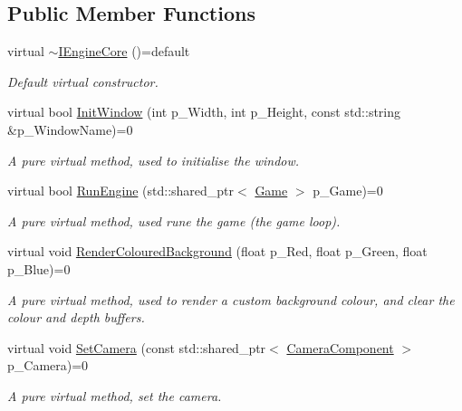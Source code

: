 \subsection*{Public Member Functions}
\begin{DoxyCompactItemize}
\item 
\mbox{\label{class_i_engine_core_a2befdb05ea4c96642116bd75ee372798}} 
virtual \mbox{\hyperlink{class_i_engine_core_a2befdb05ea4c96642116bd75ee372798}{$\sim$\+I\+Engine\+Core}} ()=default
\begin{DoxyCompactList}\small\item\em Default virtual constructor. \end{DoxyCompactList}\item 
virtual bool \mbox{\hyperlink{class_i_engine_core_afdda3dcf95128f802a9328b7f1d9a0bf}{Init\+Window}} (int p\+\_\+\+Width, int p\+\_\+\+Height, const std\+::string \&p\+\_\+\+Window\+Name)=0
\begin{DoxyCompactList}\small\item\em A pure virtual method, used to initialise the window. \end{DoxyCompactList}\item 
virtual bool \mbox{\hyperlink{class_i_engine_core_a34dab1237d44daac83d14676d2b17ff6}{Run\+Engine}} (std\+::shared\+\_\+ptr$<$ \mbox{\hyperlink{class_game}{Game}} $>$ p\+\_\+\+Game)=0
\begin{DoxyCompactList}\small\item\em A pure virtual method, used rune the game (the game loop). \end{DoxyCompactList}\item 
virtual void \mbox{\hyperlink{class_i_engine_core_adc681491ab4cdf75db64068221645635}{Render\+Coloured\+Background}} (float p\+\_\+\+Red, float p\+\_\+\+Green, float p\+\_\+\+Blue)=0
\begin{DoxyCompactList}\small\item\em A pure virtual method, used to render a custom background colour, and clear the colour and depth buffers. \end{DoxyCompactList}\item 
virtual void \mbox{\hyperlink{class_i_engine_core_ac9f6dbe2b0e1ece6f6cc44712b9b8751}{Set\+Camera}} (const std\+::shared\+\_\+ptr$<$ \mbox{\hyperlink{class_camera_component}{Camera\+Component}} $>$ p\+\_\+\+Camera)=0
\begin{DoxyCompactList}\small\item\em A pure virtual method, set the camera. \end{DoxyCompactList}\item 

\end{DoxyCompactItemize}
